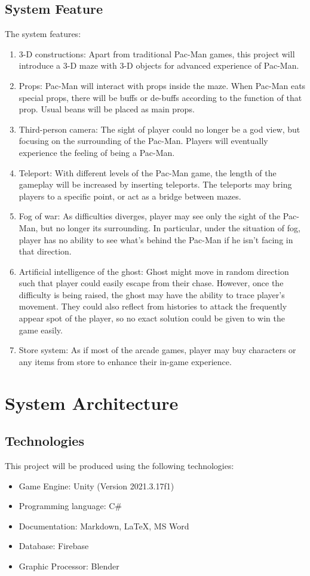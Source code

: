 \documentclass[11pt]{article}
\begin{document}
\subsection{System Feature}
\par The system features:
\begin{enumerate}
    \item 3-D constructions: Apart from traditional Pac-Man games, this project will introduce a 3-D maze with 3-D objects for advanced experience of Pac-Man.
    \item Props: Pac-Man will interact with props inside the maze. When Pac-Man eats special props, there will be buffs or de-buffs according to the function of that prop. Usual beans will be placed as main props.
    \item Third-person camera: The sight of player could no longer be a god view, but focusing on the surrounding of the Pac-Man. Players will eventually experience the feeling of being a Pac-Man.
    \item Teleport: With different levels of the Pac-Man game, the length of the gameplay will be increased by inserting teleports. The teleports may bring players to a specific point, or act as a bridge between mazes.
    \item Fog of war: As difficulties diverges, player may see only the sight of the Pac-Man, but no longer its surrounding. In particular, under the situation of fog, player has no ability to see what's behind the Pac-Man if he isn't facing in that direction.
    \item Artificial intelligence of the ghost: Ghost might move in random direction such that player could easily escape from their chase. However, once the difficulty is being raised, the ghost may have the ability to trace player's movement. They could also reflect from histories to attack the frequently appear spot of the player, so no exact solution could be given to win the game easily.
    \item Store system: As if most of the arcade games, player may buy characters or any items from store to enhance their in-game experience.
\end{enumerate}
\section{System Architecture}
\subsection{Technologies}
\par This project will be produced using the following technologies:
\begin{itemize}
    \item Game Engine: Unity (Version 2021.3.17f1)
    \item Programming language: C\#
    \item Documentation: Markdown, LaTeX, MS Word
    \item Database: Firebase
    \item Graphic Processor: Blender
\end{itemize}
\end{document}
